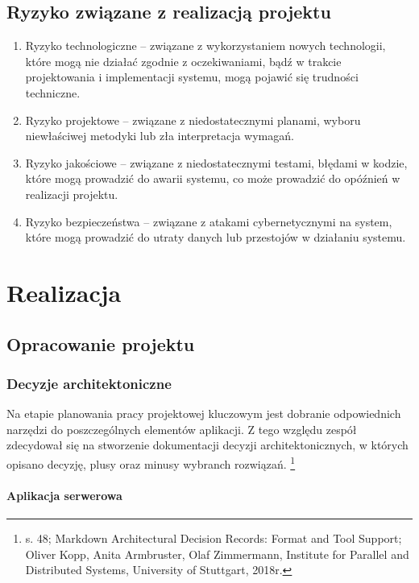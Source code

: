 \documentclass[12pt, a4paper, twoside, openany]{book}
\begin{document}
\section{Ryzyko związane z realizacją projektu}

\begin{enumerate}[label=--]
    \item Ryzyko technologiczne -- związane z wykorzystaniem nowych technologii, które mogą nie działać zgodnie z oczekiwaniami, bądź w trakcie projektowania i implementacji systemu, mogą pojawić się trudności techniczne.
    \item Ryzyko projektowe -- związane z niedostatecznymi planami, wyboru niewłaściwej metodyki lub zła interpretacja wymagań.
    \item Ryzyko jakościowe -- związane z niedostatecznymi testami, błędami w kodzie, które mogą prowadzić do awarii systemu, co może prowadzić do opóźnień w realizacji projektu.
    \item Ryzyko bezpieczeństwa -- związane z atakami cybernetycznymi na system, które mogą prowadzić do utraty danych lub przestojów w działaniu systemu.
\end{enumerate}

\chapter{Realizacja}

\section{Opracowanie projektu}

\subsection{Decyzje architektoniczne}

Na etapie planowania pracy projektowej kluczowym jest dobranie odpowiednich narzędzi
do poszczególnych elementów aplikacji. Z tego względu zespół zdecydował się na stworzenie
dokumentacji decyzji architektonicznych, w których opisano decyzję, plusy oraz minusy wybranch rozwiązań. \footnote{s. 48; Markdown Architectural Decision Records: Format and Tool Support; Oliver Kopp, Anita Armbruster, Olaf Zimmermann, Institute for Parallel and Distributed Systems, University of Stuttgart, 2018r.}

\subsubsection{Aplikacja serwerowa}
\end{document}
